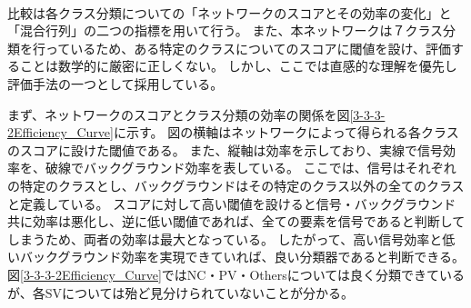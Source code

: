 \begin{table}[htb]
 \centering
　\small
  \caption{評価のための飛跡対についてのモデル}
  \label{EvalationModels}
\end{table}

比較は各クラス分類についての「ネットワークのスコアとその効率の変化」と「混合行列」の二つの指標を用いて行う。
また、本ネットワークは７クラス分類を行っているため、ある特定のクラスについてのスコアに閾値を設け、評価することは数学的に厳密に正しくない。
しかし、ここでは直感的な理解を優先し評価手法の一つとして採用している。

まず、ネットワークのスコアとクラス分類の効率の関係を図\ref{3-3-3-2Efficiency_Curve}に示す。
図の横軸はネットワークによって得られる各クラスのスコアに設けた閾値である。
また、縦軸は効率を示しており、実線で信号効率を、破線でバックグラウンド効率を表している。
ここでは、信号はそれぞれの特定のクラスとし、バックグラウンドはその特定のクラス以外の全てのクラスと定義している。
スコアに対して高い閾値を設けると信号・バックグラウンド共に効率は悪化し、逆に低い閾値であれば、全ての要素を信号であると判断してしまうため、両者の効率は最大となっている。
したがって、高い信号効率と低いバックグラウンド効率を実現できていれば、良い分類器であると判断できる。
図\ref{3-3-3-2Efficiency_Curve}ではNC・PV・Othersについては良く分類できているが、各SVについては殆ど見分けられていないことが分かる。

